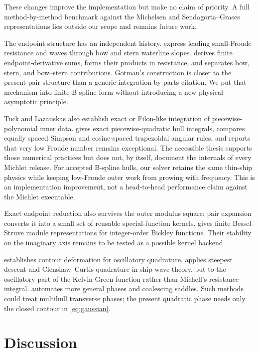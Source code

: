 \documentclass[10pt]{article}
\begin{document}
These changes improve the implementation but make no claim of priority.  A full
method-by-method benchmark against the Michelsen and Sendagorta--Grases
representations lies outside our scope and remains future work.

The endpoint structure has an independent history.
\citet{KellerAhluwalia1976} express leading small-Froude resistance and waves
through bow and stern waterline slopes.  \citet[pp.~83--85]{Gotman2002}
derives finite endpoint-derivative sums, forms their products in resistance,
and separates bow, stern, and bow--stern contributions.  Gotman's construction
is closer to the present pair structure than a generic integration-by-parts
citation.  We put that mechanism into finite B-spline form without introducing
a new physical asymptotic principle.

Tuck and Lazauskas also establish exact or Filon-like integration of
piecewise-polynomial inner data.
\citet[sec.~6.5, pp.~6-10--6-12]{Lazauskas2009} gives exact
piecewise-quadratic hull integrals, compares equally spaced Simpson and
cosine-spaced trapezoidal angular rules, and reports that very low Froude
number remains exceptional.  The accessible thesis supports those numerical
practices but does not, by itself, document the internals of every Michlet
release.  For accepted B-spline hulls, our solver retains the same thin-ship
physics while keeping low-Froude outer work from growing with frequency.  This
is an implementation improvement, not a head-to-head performance claim against
the Michlet executable.

Exact endpoint reduction also survives the outer modulus square: pair
expansion converts it into a small set of reusable special-function kernels.
\citet{RuffaToni2026} gives finite Bessel--Struve module representations for
integer-order Bickley functions.  Their stability on the imaginary axis
remains to be tested as a possible kernel backend.

\citet{HuybrechsVandewalle2006} establishes contour deformation for
oscillatory quadrature.  \citet{Motygin2017} applies steepest descent and
Clenshaw--Curtis quadrature in ship-wave theory, but to the oscillatory part of
the Kelvin Green function rather than Michell's resistance integral.
\citet{GibbsHewettHuybrechs2024} automates more general phases and coalescing
saddles.  Such methods could treat multihull transverse phases; the present
quadratic phase needs only the closed contour in \cref{eq:gaussian}.

\section{Discussion}
\label{sec:limits}
\end{document}
